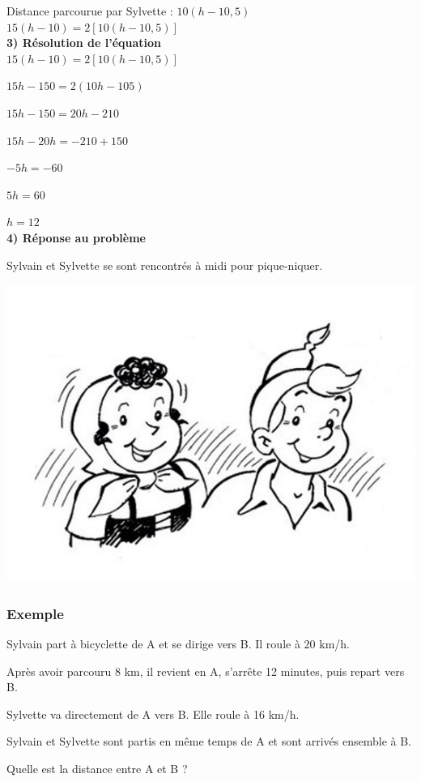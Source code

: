 Distance parcourue par Sylvette : $10\left(h-10,5\right)$ \\

$15\left(h-10\right) = 2\left[10\left(h-10,5\right)\right]$ \\

\textbf{3) Résolution de l'équation} \\

$15\left(h-10\right) = 2\left[10\left(h-10,5\right)\right]$

$ 15h - 150 = 2\left(10h-105\right) $

$ 15h - 150 = 20h - 210 $

$ 15h - 20h = -210 + 150 $

$ - 5h = - 60 $

$ 5h = 60 $

$ h = 12 $ \\

\textbf{4) Réponse au problème}

Sylvain et Sylvette se sont rencontrés à midi pour pique-niquer.

\centerline{\includegraphics[width=.6\textwidth]{Sylvain+Sylvette_NB.jpg}} 
\newpage

\subsubsection{Exemple }

Sylvain part à bicyclette de A et se dirige vers B. Il roule à $20$ km/h.



Après avoir parcouru 8 km, il revient en A, s'arrête 12 minutes, puis repart vers B.

Sylvette va directement de A vers B. Elle roule à 16 km/h.

Sylvain et Sylvette sont partis en même temps de A et sont arrivés ensemble à B.

Quelle est la distance entre A et B ? 




